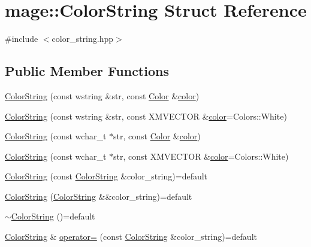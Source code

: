 \hypertarget{structmage_1_1_color_string}{}\section{mage\+:\+:Color\+String Struct Reference}
\label{structmage_1_1_color_string}


{\ttfamily \#include $<$color\+\_\+string.\+hpp$>$}

\subsection*{Public Member Functions}
\begin{DoxyCompactItemize}
\item 
\hyperlink{structmage_1_1_color_string_a9737fbe265c4432971e715439827f25a}{Color\+String} (const wstring \&str, const \hyperlink{structmage_1_1_color}{Color} \&\hyperlink{namespacemage_a56eceea5a9bceb2b56073f3ea4945781}{color})
\item 
\hyperlink{structmage_1_1_color_string_ab1f686b1ae86aedb444d02951658709d}{Color\+String} (const wstring \&str, const X\+M\+V\+E\+C\+T\+OR \&\hyperlink{namespacemage_a56eceea5a9bceb2b56073f3ea4945781}{color}=Colors\+::\+White)
\item 
\hyperlink{structmage_1_1_color_string_aef572c89d1ed663837c6e5b1b6816984}{Color\+String} (const wchar\+\_\+t $\ast$str, const \hyperlink{structmage_1_1_color}{Color} \&\hyperlink{namespacemage_a56eceea5a9bceb2b56073f3ea4945781}{color})
\item 
\hyperlink{structmage_1_1_color_string_a1a7826048fbe997d789fbae4ae97d35d}{Color\+String} (const wchar\+\_\+t $\ast$str, const X\+M\+V\+E\+C\+T\+OR \&\hyperlink{namespacemage_a56eceea5a9bceb2b56073f3ea4945781}{color}=Colors\+::\+White)
\item 
\hyperlink{structmage_1_1_color_string_aa878fda012b4149f673e905f6a8ea8b0}{Color\+String} (const \hyperlink{structmage_1_1_color_string}{Color\+String} \&color\+\_\+string)=default
\item 
\hyperlink{structmage_1_1_color_string_a68d8411da4dd7122975223e25bbcbb9a}{Color\+String} (\hyperlink{structmage_1_1_color_string}{Color\+String} \&\&color\+\_\+string)=default
\item 
\hyperlink{structmage_1_1_color_string_a95886010269c8c4bc3a27fbfe829f4c2}{$\sim$\+Color\+String} ()=default
\item 
\hyperlink{structmage_1_1_color_string}{Color\+String} \& \hyperlink{structmage_1_1_color_string_a568fed43403422ecafdf92d04e11c4e5}{operator=} (const \hyperlink{structmage_1_1_color_string}{Color\+String} \&color\+\_\+string)=default

\end{DoxyCompactItemize}
